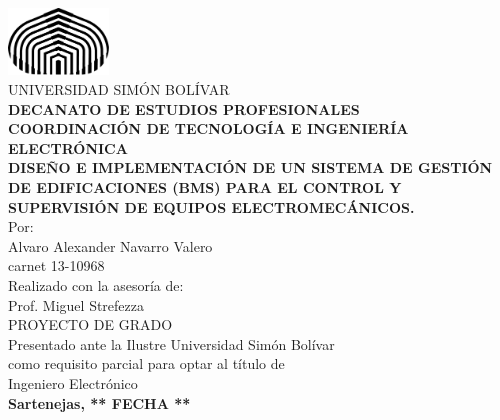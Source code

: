 \thispagestyle{empty}
\begin{center}
\includegraphics[width=0.20\textwidth]{Figuras/USB_logo.eps}\\ %
{\large UNIVERSIDAD SIMÓN BOLÍVAR}\\\textbf{DECANATO DE ESTUDIOS PROFESIONALES}\\\textbf{COORDINACIÓN DE TECNOLOGÍA E INGENIERÍA ELECTRÓNICA} %
\\[8\baselineskip]

\textbf{DISEÑO E IMPLEMENTACIÓN DE UN SISTEMA DE GESTIÓN DE EDIFICACIONES (BMS) PARA EL CONTROL Y SUPERVISIÓN DE EQUIPOS ELECTROMECÁNICOS.}
\\[2\baselineskip]

Por:\\ Alvaro Alexander Navarro Valero\\ carnet 13-10968
\\[2\baselineskip]

Realizado con la asesoría de:\\ Prof. Miguel Strefezza
\\[4\baselineskip]

PROYECTO DE GRADO\\Presentado ante la Ilustre Universidad Simón Bolívar\\como requisito parcial para optar al título de \\ Ingeniero Electrónico
\\[2\baselineskip]

\textbf{Sartenejas, ** FECHA **}
\end{center}
